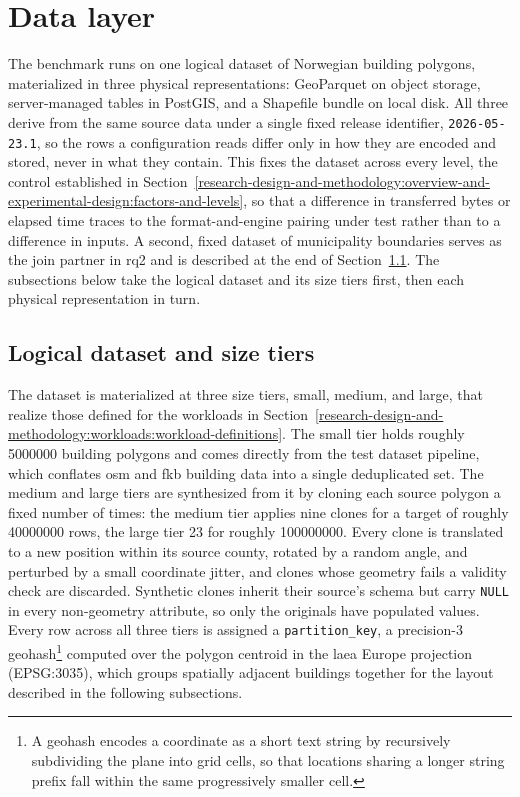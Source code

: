 \section{Data layer}
\label{system-architecture-and-implementation:data-layer}
The benchmark runs on one logical dataset of Norwegian building polygons, materialized in three physical representations: GeoParquet on object storage, server-managed tables in PostGIS, and a Shapefile bundle on local disk. All three derive from the same source data under a single fixed release identifier, \texttt{2026-05-23.1}, so the rows a configuration reads differ only in how they are encoded and stored, never in what they contain. This fixes the dataset across every level, the control established in Section~\ref{research-design-and-methodology:overview-and-experimental-design:factors-and-levels}, so that a difference in transferred bytes or elapsed time traces to the format-and-engine pairing under test rather than to a difference in inputs. A second, fixed dataset of municipality boundaries serves as the join partner in \acrshort{rq}2 and is described at the end of Section~\ref{system-architecture-and-implementation:data-layer:logical-dataset-and-size-tiers}. The subsections below take the logical dataset and its size tiers first, then each physical representation in turn.

\subsection{Logical dataset and size tiers}
\label{system-architecture-and-implementation:data-layer:logical-dataset-and-size-tiers}
The dataset is materialized at three size tiers, small, medium, and large, that realize those defined for the workloads in Section~\ref{research-design-and-methodology:workloads:workload-definitions}. The small tier holds roughly \num{5000000} building polygons and comes directly from the test dataset pipeline, which conflates \acrshort{osm} and \acrshort{fkb} building data into a single deduplicated set. The medium and large tiers are synthesized from it by cloning each source polygon a fixed number of times: the medium tier applies nine clones for a target of roughly \num{40000000} rows, the large tier \num{23} for roughly \num{100000000}. Every clone is translated to a new position within its source county, rotated by a random angle, and perturbed by a small coordinate jitter, and clones whose geometry fails a validity check are discarded. Synthetic clones inherit their source's schema but carry \texttt{NULL} in every non-geometry attribute, so only the originals have populated values. Every row across all three tiers is assigned a \texttt{partition\_key}, a precision-3 geohash\footnote{A geohash encodes a coordinate as a short text string by recursively subdividing the plane into grid cells, so that locations sharing a longer string prefix fall within the same progressively smaller cell.} computed over the polygon centroid in the \acrfull{laea} Europe projection (EPSG:3035), which groups spatially adjacent buildings together for the layout described in the following subsections.

